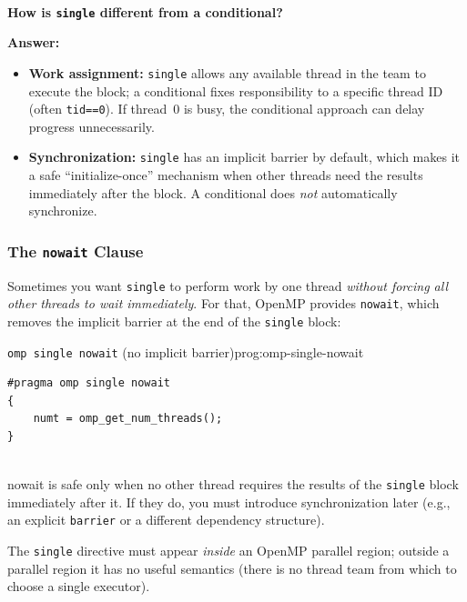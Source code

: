 \begin{ppquestion}
\textbf{\\How is \texttt{single} different from a conditional?}

\textbf{Answer:}
\begin{itemize}
    \item \textbf{Work assignment:} \texttt{single} allows any available thread in the team to execute the block; a conditional fixes responsibility to a specific thread ID (often \texttt{tid==0}). If thread~0 is busy, the conditional approach can delay progress unnecessarily.
    \item \textbf{Synchronization:} \texttt{single} has an implicit barrier by default, which makes it a safe ``initialize-once'' mechanism when other threads need the results immediately after the block. A conditional does \emph{not} automatically synchronize.
\end{itemize}
\end{ppquestion}

\subsubsection{The \texttt{nowait} Clause}

Sometimes you want \texttt{single} to perform work by one thread \emph{without forcing all other threads to wait immediately}. For that, OpenMP provides \texttt{nowait}, which removes the implicit barrier at the end of the \texttt{single} block:

\begin{ppprogram}{\texttt{omp single nowait} (no implicit barrier)}{prog:omp-single-nowait}
\begin{lstlisting}[language=OpenMP]
#pragma omp single nowait
{
    numt = omp_get_num_threads();
}
\end{lstlisting}
\end{ppprogram}

\begin{ppnote}
\texttt\\{nowait} is safe only when no other thread requires the results of the \texttt{single} block immediately after it. If they do, you must introduce synchronization later (e.g., an explicit \texttt{barrier} or a different dependency structure).
\end{ppnote}

The \texttt{single} directive must appear \emph{inside} an OpenMP parallel region; outside a parallel region it has no useful semantics (there is no thread team from which to choose a single executor).

